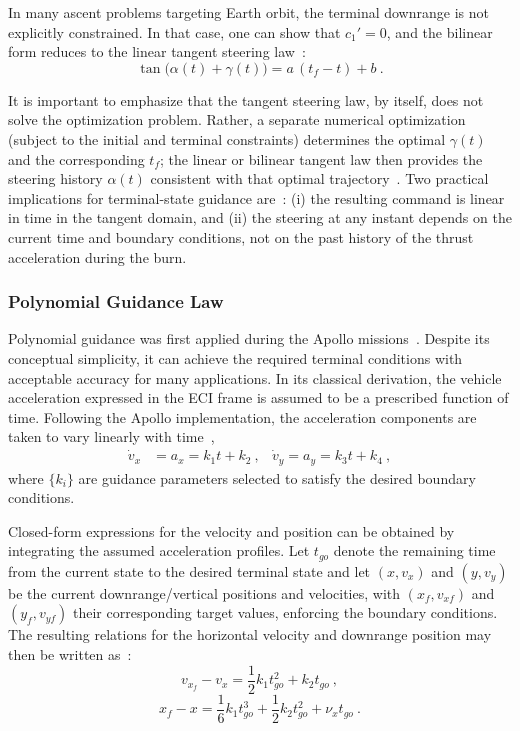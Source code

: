 In many ascent problems targeting Earth orbit, the terminal downrange is not explicitly
constrained. In that case, one can show that $c_1'=0$, and the bilinear form reduces to
the linear tangent steering law~\cite{Ulrich}:
\begin{equation}
\tan\!\big(\alpha(t)+\gamma(t)\big)
=
a\,(t_f-t)+b \ .
\end{equation}

It is important to emphasize that the tangent steering law, by itself, does not solve the
optimization problem. Rather, a separate numerical optimization (subject to the initial and
terminal constraints) determines the optimal $\gamma(t)$ and the corresponding $t_f$; the
linear or bilinear tangent law then provides the steering history $\alpha(t)$ consistent with
that optimal trajectory~\cite{Ulrich}. Two practical implications for terminal-state guidance are~\cite{Ulrich}: (i) the
resulting command is linear in time in the tangent domain, and (ii) the steering at any
instant depends on the current time and boundary conditions, not on the past history of
the thrust acceleration during the burn.


\subsubsection{Polynomial Guidance Law}
\label{sec:polynomial}

Polynomial guidance was first applied during the Apollo missions~\cite{bennett1970lunar}. Despite its conceptual simplicity, it can achieve the required terminal conditions with acceptable accuracy for many applications. In its classical derivation, the vehicle acceleration expressed in the ECI frame is assumed to be a prescribed function of time. Following the Apollo implementation, the acceleration components are taken to vary linearly with time~\cite{Mooij_lunar_ascent},
\begin{equation}
\begin{aligned}
\dot{v}_x &= a_x = k_1 t + k_2 \ , &
\dot{v}_y = a_y = k_3 t + k_4 \ ,
\end{aligned}
\end{equation}
where $\{k_i\}$ are guidance parameters selected to satisfy the desired boundary conditions.

Closed-form expressions for the velocity and position can be obtained by integrating the assumed acceleration profiles. Let $t_{go}$ denote the remaining time from the current state to the desired terminal state and let $(x,v_x)$ and $(y,v_y)$ be the current downrange/vertical positions and velocities,
with $(x_f,v_{xf})$ and $(y_f,v_{yf})$ their corresponding target values, enforcing the boundary conditions. The resulting relations for the horizontal velocity and downrange position may then be written as~\cite{sostaric2005powered}:
\begin{equation}
v_{x_f}-v_x = \frac{1}{2}k_1 t_{go}^2 + k_2 t_{go} \ ,
\end{equation}
\begin{equation}
x_f-x = \frac{1}{6}k_1 t_{go}^3 + \frac{1}{2}k_2 t_{go}^2 + \nu_x t_{go} \ .
\end{equation}

